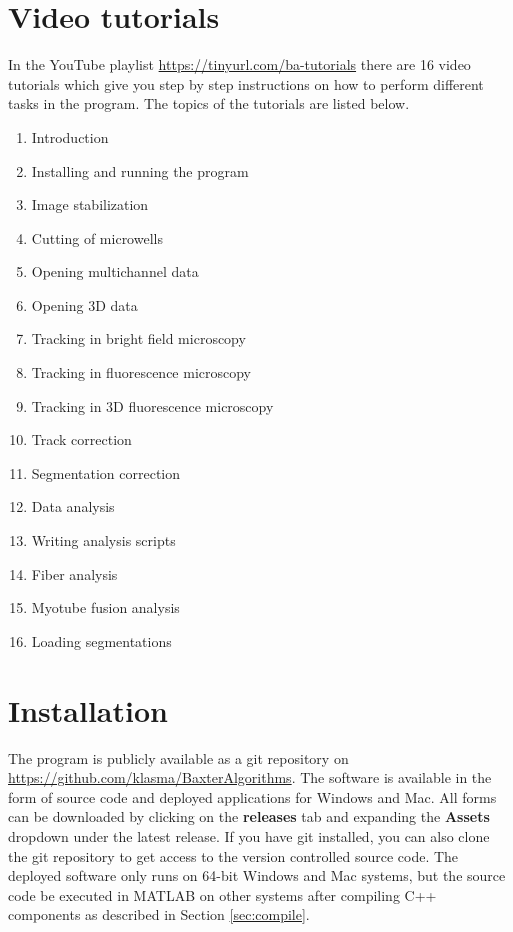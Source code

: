 \documentclass[a4paper, oneside, onecolumn, 11pt]{article}
\newcommand{\control}[1]{\textbf{#1}}
\begin{document}
\section{Video tutorials}
In the YouTube playlist \url{https://tinyurl.com/ba-tutorials} there are 16 video tutorials which give you step by step instructions on how to perform different tasks in the program. The topics of the tutorials are listed below.

\begin{enumerate}
\item Introduction
\item Installing and running the program
\item Image stabilization
\item Cutting of microwells
\item Opening multichannel data
\item Opening 3D data
\item Tracking in bright field microscopy
\item Tracking in fluorescence microscopy
\item Tracking in 3D fluorescence microscopy
\item Track correction
\item Segmentation correction
\item Data analysis
\item Writing analysis scripts
\item Fiber analysis
\item Myotube fusion analysis
\item Loading segmentations
\end{enumerate}

\section{Installation}
\label{sec:installation}
The program is publicly available as a git repository on \url{https://github.com/klasma/BaxterAlgorithms}. The software is available in the form of source code and deployed applications for Windows and Mac. All forms can be downloaded by clicking on the \control{releases} tab and expanding the \control{Assets} dropdown under the latest release. If you have git installed, you can also clone the git repository to get access to the version controlled source code. The deployed software only runs on 64-bit Windows and Mac systems, but the source code be executed in MATLAB on other systems after compiling C++ components as described in Section \ref{sec:compile}.
\end{document}
